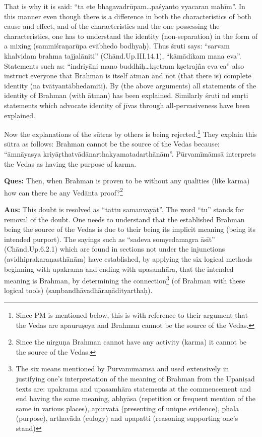 \vskip 2pt

That is why it is said: “ta ete bhagavadrūpam…paśyanto vyacaran mahīm”. In this manner even though there is a difference in both the characteristics of both cause and effect, and of the characteristics and the one possessing the characteristics, one has to understand the identity (non-separation) in the form of a mixing (sammiśraṇarūpa evābhedo bodhyaḥ). Thus śruti says: “sarvam khalvidam brahma tajjalāniti” (Chānd.Up.III.14.1), “kāmādikam mana eva”. Statements such as: “indriyāṇi mano buddhiḥ…kṣetram kṣetrajña eva ca” also instruct everyone that Brahman is itself ātman and not (that there is) complete identity (na tvātyantābhedamiti). By (the above arguments) all statements of the identity of Brahman (with ātman) has been explained. Similarly śruti nd smṛti statements which advocate identity of jīvas through all-pervasiveness have been explained.

\vskip 2pt

Now the explanations of the sūtras by others is being rejected.\footnote{Since PM is mentioned below, this is with reference to their argument that the Vedas are apauruṣeya and Brahman cannot be the source of the Vedas.} They explain this sūtra as follows: Brahman cannot be the source of the Vedas because: “āmnāyasya kriyāṛthatvādānarthakyamatadarthā\-nām”. Pūrvamīmāmsā interprets the Vedas as having the purpose of karma. 

\textbf{Ques:} Then, when Brahman is proven to be without any qualities (like karma) how can there be any Vedānta proof?\footnote{Since the nirguṇa Brahman cannot have any activity (karma) it cannot be the source of the Vedas.}

\textbf{Ans:} This doubt is resolved as “tattu samanvayāt”. The word “tu” stands for removal of the doubt. One needs to understand that the established Brahman being the source of the Vedas is due to their being its implicit meaning (being its intended purport). The sayings such as “sadeva somyedamagra āsīt” (Chānd.Up.6.2.1) which are found in sections not under the injunctions (avidhiprakaraṇasthānām) have established, by applying the six logical methods beginning with upakrama and ending with upasamhāra, that the intended meaning is Brahman, by determining the connection\footnote{The six means mentioned by Pūrvamīmāmsā and used extensively in justifying one’s interpretation of the meaning of Brahman from the Upaniṣad texts are: upakrama and upasamhāra statements at the commencement and end having the same meaning, abhyāsa (repetition or frequent mention of the same in various places), apūrvatā (presenting of unique evidence), phala (purpose), arthavāda (eulogy) and upapatti (reasoning supporting one’s stand)} (of Brahman with these logical tools) (saṃbandhāvadhāraṇādityarthaḥ).

